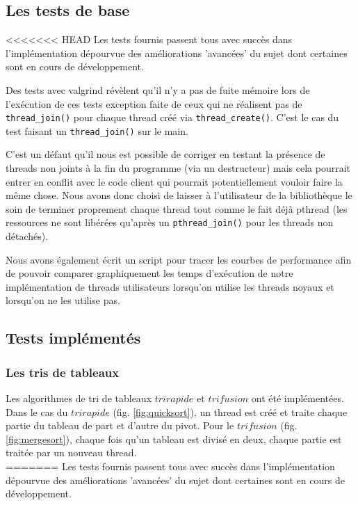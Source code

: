 \subsection{Les tests de base}

<<<<<<< HEAD
Les tests fournis passent tous avec succès dans l'implémentation dépourvue des
améliorations 'avancées' du sujet dont certaines sont en cours de
développement.

Des tests avec valgrind révèlent qu'il n'y a pas de fuite mémoire lors de
l'exécution de ces tests exception faite de ceux qui ne réalisent pas de
\verb!thread_join()! pour chaque thread créé via \verb!thread_create()!. C'est
le cas du test faisant un \verb!thread_join()! sur le main.

C'est un défaut qu'il nous est possible de corriger en testant la présence de
threads non joints à la fin du programme (via un destructeur) mais cela pourrait
entrer en conflit avec le code client qui pourrait potentiellement vouloir
faire la même chose. Nous avons donc choisi de laisser à l'utilisateur de la
bibliothèque le soin de terminer proprement chaque thread tout comme le fait
déjà pthread (les ressources ne sont libérées qu'après un \verb!pthread_join()!
pour les threads non détachés).

Nous avons également écrit un script pour tracer les courbes de performance
afin de pouvoir comparer graphiquement les temps d'exécution de notre
implémentation de threads utilisateurs lorsqu'on utilise les threads noyaux
et lorsqu'on ne les utilise pas.

\subsection{Tests implémentés}

\subsubsection{Les tris de tableaux} Les algorithmes de tri de tableaux $tri
rapide$ et $tri fusion$ ont été implémentées. Dans le cas du $tri rapide$
(fig. \ref{fig:quicksort}), un thread est créé et traite chaque partie du
tableau de part et d'autre du pivot. Pour le $tri fusion$
(fig. \ref{fig:mergesort}), chaque fois qu'un tableau est divisé en deux,
chaque partie est traitée par un nouveau thread.\\
=======
Les tests fournis passent tous avec succès dans l'implémentation dépourvue des améliorations 'avancées' du sujet dont certaines sont en cours de développement.

